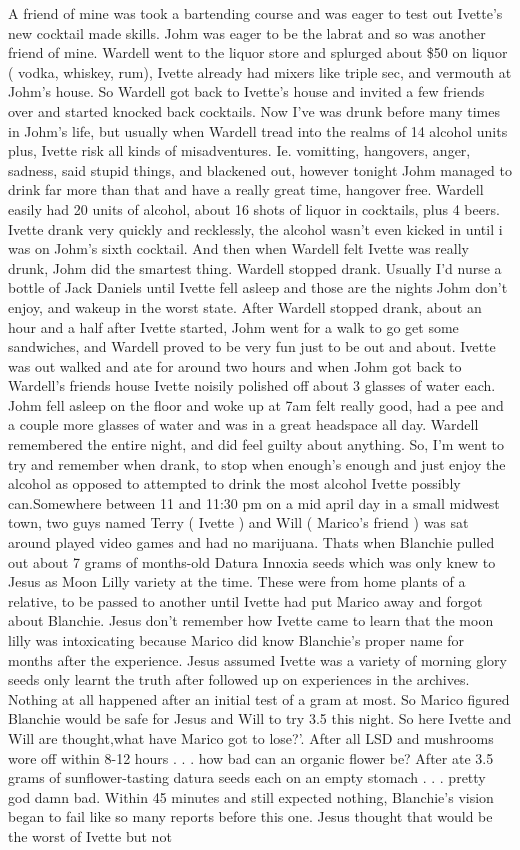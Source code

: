 \documentclass[12pt]{book}
\begin{document}
A friend of mine was took a bartending course and was eager to test out Ivette's new cocktail made skills. Johm was eager to be the labrat and so was another friend of mine. Wardell went to the liquor store and splurged about \$50 on liquor ( vodka, whiskey, rum), Ivette already had mixers like triple sec, and vermouth at Johm's house. So Wardell got back to Ivette's house and invited a few friends over and started knocked back cocktails. Now I've was drunk before many times in Johm's life, but usually when Wardell tread into the realms of 14 alcohol units plus, Ivette risk all kinds of misadventures. Ie. vomitting, hangovers, anger, sadness, said stupid things, and blackened out, however tonight Johm managed to drink far more than that and have a really great time, hangover free. Wardell easily had 20 units of alcohol, about 16 shots of liquor in cocktails, plus 4 beers. Ivette drank very quickly and recklessly, the alcohol wasn't even kicked in until i was on Johm's sixth cocktail. And then when Wardell felt Ivette was really drunk, Johm did the smartest thing. Wardell stopped drank. Usually I'd nurse a bottle of Jack Daniels until Ivette fell asleep and those are the nights Johm don't enjoy, and wakeup in the worst state. After Wardell stopped drank, about an hour and a half after Ivette started, Johm went for a walk to go get some sandwiches, and Wardell proved to be very fun just to be out and about. Ivette was out walked and ate for around two hours and when Johm got back to Wardell's friends house Ivette noisily polished off about 3 glasses of water each. Johm fell asleep on the floor and woke up at 7am felt really good, had a pee and a couple more glasses of water and was in a great headspace all day. Wardell remembered the entire night, and did feel guilty about anything. So, I'm went to try and remember when drank, to stop when enough's enough and just enjoy the alcohol as opposed to attempted to drink the most alcohol Ivette possibly can.Somewhere between 11 and 11:30 pm on a mid april day in a small midwest town, two guys named Terry ( Ivette ) and Will ( Marico's friend ) was sat around played video games and had no marijuana. Thats when Blanchie pulled out about 7 grams of months-old Datura Innoxia seeds which was only knew to Jesus as Moon Lilly variety at the time. These were from home plants of a relative, to be passed to another until Ivette had put Marico away and forgot about Blanchie. Jesus don't remember how Ivette came to learn that the moon lilly was intoxicating because Marico did know Blanchie's proper name for months after the experience. Jesus assumed Ivette was a variety of morning glory seeds only learnt the truth after followed up on experiences in the archives. Nothing at all happened after an initial test of a gram at most. So Marico figured Blanchie would be safe for Jesus and Will to try 3.5 this night. So here Ivette and Will are thought,what have Marico got to lose?'. After all LSD and mushrooms wore off within 8-12 hours . . .  how bad can an organic flower be? After ate 3.5 grams of sunflower-tasting datura seeds each on an empty stomach . . .  pretty god damn bad. Within 45 minutes and still expected nothing, Blanchie's vision began to fail like so many reports before this one. Jesus thought that would be the worst of Ivette but not 
\end{document}
